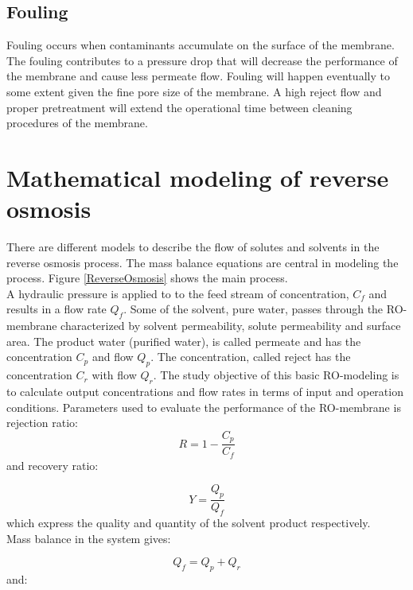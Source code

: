 \subsection{Fouling}
Fouling occurs when contaminants accumulate on the surface of the membrane. The fouling contributes to a pressure drop that will decrease the performance of the membrane and cause less permeate flow. Fouling will happen eventually to some extent given the fine pore size of the membrane. A high reject flow and proper pretreatment will extend the operational time between cleaning procedures of the membrane\cite{Puretech}. 

\section{Mathematical modeling of reverse osmosis} \label{SD}
There are different models to describe the flow of solutes and solvents in the reverse osmosis process. The mass balance equations are central in modeling the process. Figure \ref{ReverseOsmosis} shows the main process. \\

A hydraulic pressure is applied to to the feed stream of concentration, $C_{f}$ and results in a flow rate $Q_{f}$. Some of the solvent, pure water, passes through the RO-membrane  characterized by solvent permeability, solute permeability and surface area. The product water (purified water), is called permeate and has the concentration $C_p$ and flow $Q_p$. The concentration, called reject has the concentration $C_r$ with flow $Q_r$. The study objective of this basic RO-modeling is to calculate output concentrations and flow rates in terms of input and operation conditions. Parameters used to evaluate the performance of the RO-membrane is rejection ratio:
\begin{equation}
\label{eq:rejection}
R=1-\frac{C_{p}}{C_{f}}
\end{equation}
and recovery ratio:

\begin{equation}
\label{eq:recovery}
Y=\frac{Q_{p}}{Q_{f}}
\end{equation}
which express the quality and quantity of the solvent product respectively. 
\\Mass balance in the system gives:

\begin{equation}
\label{eq:feedflow}
Q_{f}=Q_{p}+Q_{r}
\end{equation}
and:

